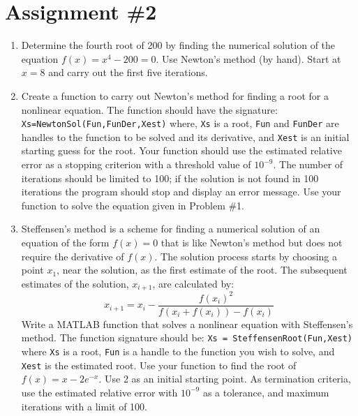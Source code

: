 \chapter{Assignment \#2}
\label{ch:ass2n}
\begin{fullwidth}

\begin{enumerate}
\item Determine the fourth root of 200 by finding the numerical solution of the equation $f(x) = x^4 - 200 = 0$.  Use Newton's method (by hand).  Start at $x=8$ and carry out the first five iterations.

\vspace{2.0cm}

\item Create a function to carry out Newton's method for finding a root for a nonlinear equation.  The function should have the signature: \lstinline[style=myMatlab]{Xs=NewtonSol(Fun,FunDer,Xest)} where, \lstinline[style=myMatlab]{Xs} is a root, \lstinline[style=myMatlab]{Fun} and \lstinline[style=myMatlab]{FunDer} are handles to the function to be solved and its derivative, and \lstinline[style=myMatlab]{Xest} is an initial starting guess for the root.  Your function should use the estimated relative error as a stopping criterion with a threshold value of $10^{-9}$.  The number of iterations should be limited to 100; if the solution is not found in 100 iterations the program should stop and display an error message.  Use your function to solve the equation given in Problem \#1.

\vspace{2.0cm}

\item Steffensen's method is a scheme for finding a numerical solution of an equation of the form $f(x)=0$ that is like Newton's method but does not require the derivative of $f(x)$.  The solution process starts by choosing a point $x_1$, near the solution, as the first estimate of the root.  The subsequent estimates of the solution, $x_{i+1}$, are calculated by:
\begin{equation*}
x_{i+1} = x_i - \frac{f(x_i)^2}{f(x_i + f(x_i)) - f(x_i)}
\end{equation*}
Write a MATLAB function that solves a nonlinear equation with Steffensen's method.  The function signature should be: \lstinline[style=myMatlab]{Xs = SteffensenRoot(Fun,Xest)} where \lstinline[style=myMatlab]{Xs} is a root, \lstinline[style=myMatlab]{Fun} is a handle to the function you wish to solve, and \lstinline[style=myMatlab]{Xest} is the estimated root.  Use your function to find the root of $f(x) = x-2e^{-x}$.  Use 2 as an initial starting point.  As termination criteria, use the estimated relative error with $10^{-9}$ as a tolerance, and maximum iterations with a limit of 100.



\end{enumerate}
\end{fullwidth}
